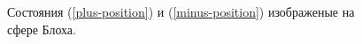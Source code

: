 \documentclass[14pt,a4paper]{PhDthesis}
\begin{document}
\begin{figure}[h]
\begin{minipage}[h]{0.49\linewidth}
\end{minipage}
\hfill
\begin{minipage}[h]{0.49\linewidth}
\end{minipage}
\caption{Состояния (\ref{plus-position}) и (\ref{minus-position}) изображеные на сфере Блоха.}
\label{ris:image1}
\end{figure}
\end{document}
